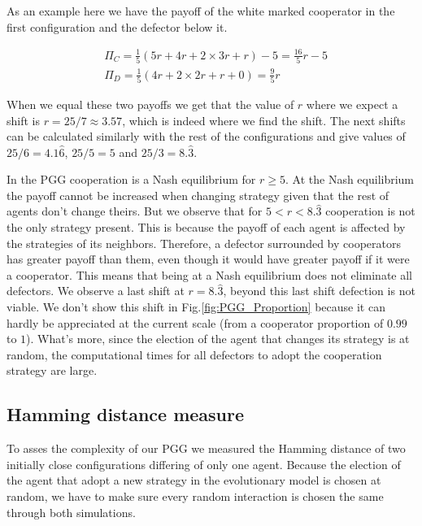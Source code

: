 As an example here we have the payoff of the white marked cooperator in the first configuration and the defector below it.

\begin{equation}
    \begin{split}
    	&\Pi_C=\frac{1}{5}(5r+4r+2\times3r+r)-5=\frac{16}{5}r-5 \\
    	&\Pi_D=\frac{1}{5}(4r+2\times2r+r+0)=\frac{9}{5}r
    \end{split}
\end{equation}

When we equal these two payoffs we get that the value of $r$ where we expect a shift is $r=25/7\approx3.57$, which is indeed where we find the shift. The next shifts can be calculated similarly with the rest of the configurations and give values of $25/6=4.1\hat6$, $25/5=5$ and $25/3=8.\hat3$.


In the PGG cooperation is a Nash equilibrium for $r\geq5$. At the Nash equilibrium  the payoff cannot be increased when changing strategy given that the rest of agents don't change theirs. But we observe that for $5<r<8.\hat3$ cooperation is not the only strategy present. This is because the payoff of each agent is affected by the strategies of its neighbors. Therefore, a defector surrounded by cooperators has greater payoff than them, even though it would have greater payoff if it were a cooperator. This means that being at a Nash equilibrium does not eliminate all defectors. We observe a last shift at $r=8.\hat3$, beyond this last shift defection is not viable.  We don't show this shift in Fig.\ref{fig:PGG_Proportion} because it can hardly be appreciated at the current scale (from a cooperator proportion of $0.99$ to $1$). What's more, since the election of the agent that changes its strategy is at random, the computational times for all defectors to adopt the cooperation strategy are large.





\subsection{Hamming distance measure}


To asses the complexity of our PGG we measured the Hamming distance of two initially close configurations differing of only one agent. Because the election of the agent that adopt a new strategy in the evolutionary model is chosen at random, we have to make sure every random interaction is chosen the same through both simulations.


